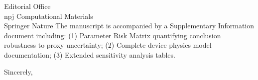 \documentclass[11pt,a4paper]{letter}
\begin{document}
\begin{letter}{Editorial Office\\npj Computational Materials\\Springer Nature}
\vspace{0.5em}
The manuscript is accompanied by a Supplementary Information document including: (1) Parameter Risk Matrix quantifying conclusion robustness to proxy uncertainty; (2) Complete device physics model documentation; (3) Extended sensitivity analysis tables.

\closing{Sincerely,}

\end{letter}
\end{document}
